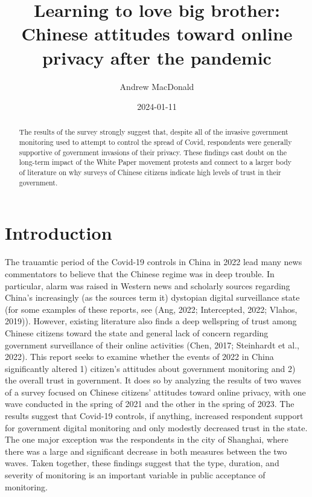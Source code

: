 \documentclass[
  letterpaper,
  DIV=11,
  numbers=noendperiod]{scrartcl}
\title{Learning to love big brother: Chinese attitudes toward online
privacy after the pandemic}
\author{Andrew MacDonald}
\date{2024-01-11}
\begin{document}
\maketitle
\begin{abstract}
The results of the survey strongly suggest that, despite all of the
invasive government monitoring used to attempt to control the spread of
Covid, respondents were generally supportive of government invasions of
their privacy. These findings cast doubt on the long-term impact of the
White Paper movement protests and connect to a larger body of literature
on why surveys of Chinese citizens indicate high levels of trust in
their government.
\end{abstract}
\ifdefined\Shaded\renewenvironment{Shaded}{\begin{tcolorbox}[breakable, sharp corners, boxrule=0pt, interior hidden, borderline west={3pt}{0pt}{shadecolor}, enhanced, frame hidden]}{\end{tcolorbox}}\fi

\hypertarget{introduction}{%
\section{Introduction}\label{introduction}}

The trauamtic period of the Covid-19 controls in China in 2022 lead many
news commentators to believe that the Chinese regime was in deep
trouble. In particular, alarm was raised in Western news and scholarly
sources regarding China's increasingly (as the sources term it)
dystopian digital surveillance state (for some examples of these
reports, see (Ang, 2022; Intercepted, 2022; Vlahos, 2019)). However,
existing literature also finds a deep wellspring of trust among Chinese
citizens toward the state and general lack of concern regarding
government surveillance of their online activities (Chen, 2017;
Steinhardt et al., 2022). This report seeks to examine whether the
events of 2022 in China significantly altered 1) citizen's attitudes
about government monitoring and 2) the overall trust in government. It
does so by analyzing the results of two waves of a survey focused on
Chinese citizens' attitudes toward online privacy, with one wave
conducted in the spring of 2021 and the other in the spring of 2023. The
results suggest that Covid-19 controls, if anything, increased
respondent support for government digital monitoring and only modestly
decreased trust in the state. The one major exception was the
respondents in the city of Shanghai, where there was a large and
significant decrease in both measures between the two waves. Taken
together, these findings suggest that the type, duration, and severity
of monitoring is an important variable in public acceptance of
monitoring.
\end{document}
